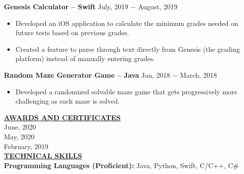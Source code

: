 \documentclass{article}
\begin{document}
\noindent \textbf{Genesis Calculator -- Swift} \hfill  July, 2019 $-$ August, 2019
\begin{itemize}[noitemsep,nolistsep,leftmargin=*]
\item {Developed an iOS application to calculate the minimum grades needed on future tests based on previous grades.}
\item {Created a feature to parse through text directly from Genesis (the grading platform) instead of manually entering grades.}\\
\end{itemize}

\noindent \textbf{Random Maze Generator Game -- Java} \hfill  Jan, 2018 $-$ March, 2018
\begin{itemize}[noitemsep,nolistsep,leftmargin=*]
\item {Developed a randomized solvable maze game that gets progressively more challenging as each maze is solved.}\\
\end{itemize}

\noindent \textbf{\underline{AWARDS AND CERTIFICATES}} \\
 \hfill June, 2020 \\
 \hfill May, 2020 \\
 \hfill February, 2019 \\

\noindent \textbf{\underline{TECHNICAL SKILLS}} \\
\noindent \textbf{Programming Languages (Proficient):} Java, Python, Swift, C/C++, C\#\\
\end{document}
